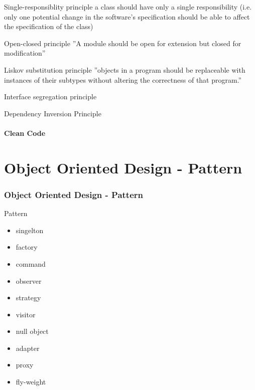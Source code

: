 \documentclass{beamer}
\begin{document}
\begin{frame}{Single-responsiblity principle}
a class should have only a single responsibility (i.e. only one potential change
in the software's specification should be able to affect the specification of the class)
\end{frame}

\begin{frame}{Open-closed principle}
''A module should be open for extension but closed for modification''
\end{frame}

\begin{frame}{Liskov substitution principle}
''objects in a program should be replaceable with instances of their subtypes
without altering the correctness of that program.''
\end{frame}

\begin{frame}{Interface segregation principle}
\end{frame}

\begin{frame}{Dependency Inversion Principle}
\end{frame}

\subsection{Clean Code}

\part{Object Oriented Design - Pattern}
\section{Object Oriented Design - Pattern}

\begin{frame}{Pattern}
\begin{itemize}
  \item singelton
  \item factory
  \item command
  \item observer
  \item strategy
  \item visitor
  \item null object
  \item adapter
  \item proxy
  \item fly-weight
\end{itemize}
\end{frame}
\end{document}
